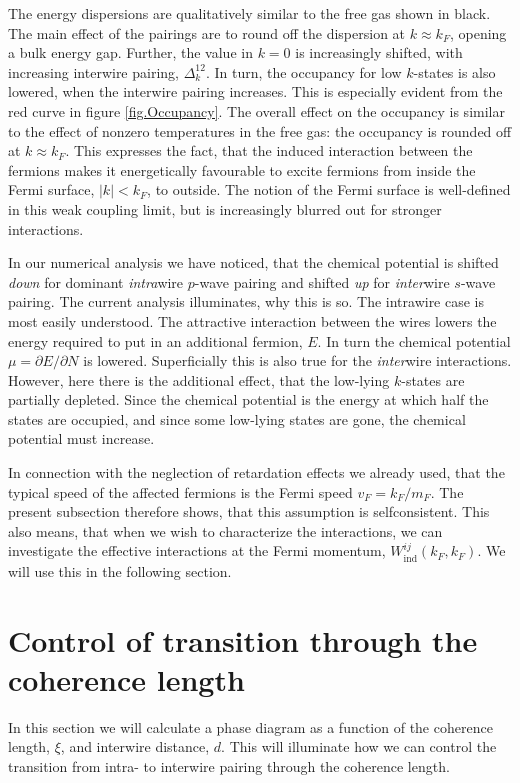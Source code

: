 The energy dispersions are qualitatively similar to the free gas shown in black. The main effect of the pairings are to round off the dispersion at $k \approx k_F$, opening a bulk energy gap. Further, the value in $k = 0$ is increasingly shifted, with increasing interwire pairing, $\Delta^{12}_k$. In turn, the occupancy for low $k$-states is also lowered, when the interwire pairing increases. This is especially evident from the red curve in figure \ref{fig.Occupancy}. The overall effect on the occupancy is similar to the effect of nonzero temperatures in the free gas: the occupancy is rounded off at $k \approx k_F$. This expresses the fact, that the induced interaction between the fermions makes it energetically favourable to excite fermions from inside the Fermi surface, $|k| < k_F$, to outside. The notion of the Fermi surface is well-defined in this weak coupling limit, but is increasingly blurred out for stronger interactions. 

In our numerical analysis we have noticed, that the chemical potential is shifted \textit{down} for dominant \textit{intra}wire $p$-wave pairing and shifted \textit{up} for \textit{inter}wire $s$-wave pairing. The current analysis illuminates, why this is so. The intrawire case is most easily understood. The attractive interaction between the wires lowers the energy required to put in an additional fermion, $E$. In turn the chemical potential $\mu = \partial E / \partial N$ is lowered. Superficially this is also true for the \textit{inter}wire interactions. However, here there is the additional effect, that the low-lying $k$-states are partially depleted. Since the chemical potential is the energy at which half the states are occupied, and since some low-lying states are gone, the chemical potential must increase. 

In connection with the neglection of retardation effects we already used, that the typical speed of the affected fermions is the Fermi speed $v_F = k_F/m_F$. The present subsection therefore shows, that this assumption is selfconsistent. This also means, that when we wish to characterize the interactions, we can investigate the effective interactions at the Fermi momentum, $W^{ij}_{\text{ind}}(k_F, k_F)$. We will use this in the following section.


\section{Control of transition through the coherence length}
\label{sec.2wires_crossover_control_coherence_length}
In this section we will calculate a phase diagram as a function of the coherence length, $\xi$, and interwire distance, $d$. This will illuminate how we can control the transition from intra- to interwire pairing through the coherence length. 

